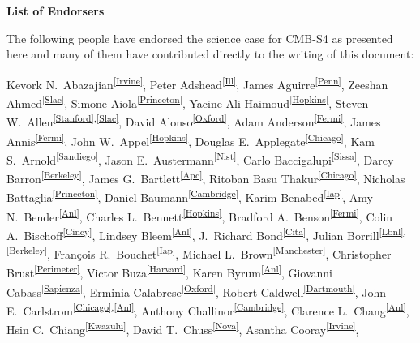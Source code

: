 \begin{center}
  {\Large \bf List of Endorsers}
\end{center}
\bigskip


The following people have endorsed the science case for CMB-S4 as presented here and many of them have contributed directly to the writing of this document:

Kevork N.~Abazajian\textsuperscript{\ref{Irvine}},
Peter Adshead\textsuperscript{\ref{Ill}},
James Aguirre\textsuperscript{\ref{Penn}},
Zeeshan Ahmed\textsuperscript{\ref{Slac}},
Simone Aiola\textsuperscript{\ref{Princeton}},
Yacine Ali-Haimoud\textsuperscript{\ref{Hopkins}},
Steven W.~Allen\textsuperscript{\ref{Stanford},\ref{Slac}},
David Alonso\textsuperscript{\ref{Oxford}},
Adam Anderson\textsuperscript{\ref{Fermi}},
James Annis\textsuperscript{\ref{Fermi}},
John W.~Appel\textsuperscript{\ref{Hopkins}}, 
Douglas E.~Applegate\textsuperscript{\ref{Chicago}}, 
Kam S.~Arnold\textsuperscript{\ref{Sandiego}}, 
Jason E.~Austermann\textsuperscript{\ref{Nist}},
Carlo Baccigalupi\textsuperscript{\ref{Sissa}}, 
Darcy Barron\textsuperscript{\ref{Berkeley}}, 
James G.~Bartlett\textsuperscript{\ref{Apc}}, 
Ritoban Basu Thakur\textsuperscript{\ref{Chicago}},
Nicholas Battaglia\textsuperscript{\ref{Princeton}},
Daniel Baumann\textsuperscript{\ref{Cambridge}},
Karim Benabed\textsuperscript{\ref{Iap}}, 
Amy N.~Bender\textsuperscript{\ref{Anl}}, 
Charles L.~Bennett\textsuperscript{\ref{Hopkins}},
Bradford A.~Benson\textsuperscript{\ref{Fermi}},
Colin A.~Bischoff\textsuperscript{\ref{Cincy}},
Lindsey Bleem\textsuperscript{\ref{Anl}}, 
J.~Richard Bond\textsuperscript{\ref{Cita}}, 
Julian Borrill\textsuperscript{\ref{Lbnl},\ref{Berkeley}}, 
François R.~Bouchet\textsuperscript{\ref{Iap}}, 
Michael L.~Brown\textsuperscript{\ref{Manchester}},
Christopher Brust\textsuperscript{\ref{Perimeter}}, 
Victor Buza\textsuperscript{\ref{Harvard}}, 
Karen Byrum\textsuperscript{\ref{Anl}}, 
Giovanni Cabass\textsuperscript{\ref{Sapienza}}, 
Erminia Calabrese\textsuperscript{\ref{Oxford}}, 
Robert Caldwell\textsuperscript{\ref{Dartmouth}}, 
John E.~Carlstrom\textsuperscript{\ref{Chicago},\ref{Anl}}, 
Anthony Challinor\textsuperscript{\ref{Cambridge}}, 
Clarence L.~Chang\textsuperscript{\ref{Anl}}, 
Hsin C.~Chiang\textsuperscript{\ref{Kwazulu}},
David T.~Chuss\textsuperscript{\ref{Nova}},
Asantha Cooray\textsuperscript{\ref{Irvine}}, 
